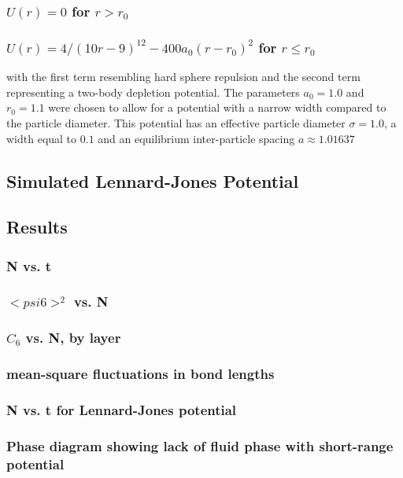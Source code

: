 \documentclass{umthesis}
\begin{document}
\subsubsection{$U(r)=0$ for $r > r_0$}
\label{sec-1.3.4.4}
\subsubsection{$U(r)=4/(10r-9)^{12} -  400 a_0 (r-r_0)^2$ for $r \le r_0$}
\label{sec-1.3.4.5}

with the first term resembling hard sphere repulsion and the second term  representing a two-body depletion potential. The parameters $a_0=1.0$ and $r_0=1.1$ were chosen to allow for  a potential with a narrow width compared to the particle diameter. This potential has an effective particle diameter $\sigma=1.0$,  a width equal to $0.1$ and an equilibrium inter-particle spacing $a \approx 1.01637$
\subsection{Simulated Lennard-Jones Potential}
\label{sec-1.3.5}
\subsection{Results}
\label{sec-1.3.6}
\subsubsection{N vs. t}
\label{sec-1.3.6.1}
\subsubsection{$< psi6 >^2$ vs. N}
\label{sec-1.3.6.2}
\subsubsection{$C_6$ vs. N, by layer}
\label{sec-1.3.6.3}
\subsubsection{mean-square fluctuations in bond lengths}
\label{sec-1.3.6.4}
\subsubsection{N vs. t for Lennard-Jones potential}
\label{sec-1.3.6.5}
\subsubsection{Phase diagram showing lack of fluid phase with short-range potential}
\label{sec-1.3.6.6}
\end{document}
